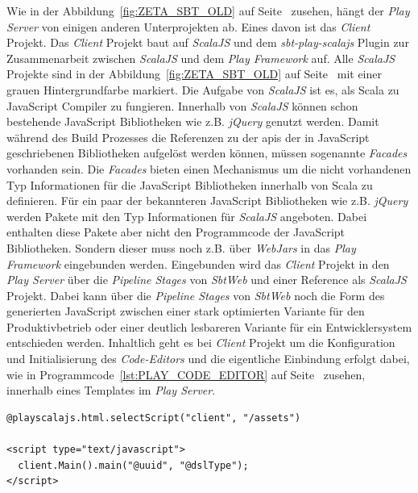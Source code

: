 Wie in der Abbildung~\ref{fig:ZETA_SBT_OLD} auf Seite~\pageref{fig:ZETA_SBT_OLD} zusehen, hängt der \textit{Play Server} von einigen anderen Unterprojekten ab. Eines davon ist das \textit{Client} Projekt. Das \textit{Client} Projekt baut auf \textit{ScalaJS} und dem \textit{sbt-play-scalajs} Plugin zur Zusammenarbeit zwischen \textit{ScalaJS} und dem \textit{Play Framework} auf. Alle \textit{ScalaJS} Projekte sind in der Abbildung~\ref{fig:ZETA_SBT_OLD} auf Seite~\pageref{fig:ZETA_SBT_OLD} mit einer grauen Hintergrundfarbe markiert. Die Aufgabe von \textit{ScalaJS} ist es, als Scala zu JavaScript Compiler zu fungieren. Innerhalb von \textit{ScalaJS} können schon bestehende JavaScript Bibliotheken wie z.B. \textit{jQuery} genutzt werden. Damit während des Build Prozesses die Referenzen zu der \acp{api} der in JavaScript geschriebenen Bibliotheken aufgelöst werden können, müssen sogenannte \textit{Facades} vorhanden sein. Die \textit{Facades} bieten einen Mechanismus um die nicht vorhandenen Typ Informationen für die JavaScript Bibliotheken innerhalb von Scala zu definieren. Für ein paar der bekannteren JavaScript Bibliotheken wie z.B. \textit{jQuery} werden Pakete mit den Typ Informationen für \textit{ScalaJS} angeboten. Dabei enthalten diese Pakete aber nicht den Programmcode der JavaScript Bibliotheken. Sondern dieser muss noch z.B. über \textit{WebJars} in das \textit{Play Framework} eingebunden werden. Eingebunden wird das \textit{Client} Projekt in den \textit{Play Server} über die \textit{Pipeline Stages} von \textit{SbtWeb} und einer Reference als \textit{ScalaJS} Projekt. Dabei kann über die \textit{Pipeline Stages} von \textit{SbtWeb} noch die Form des generierten JavaScript zwischen einer stark optimierten Variante für den Produktivbetrieb oder einer deutlich lesbareren Variante für ein Entwicklersystem entschieden werden. Inhaltlich geht es bei \textit{Client} Projekt um die Konfiguration und Initialisierung des \textit{Code-Editors} und die eigentliche Einbindung erfolgt dabei, wie in Programmcode~\ref{lst:PLAY_CODE_EDITOR} auf Seite~\pageref{lst:PLAY_CODE_EDITOR} zusehen, innerhalb eines Templates im \textit{Play Server}.

\bigskip
\begin{lstlisting}[caption={[Lade und initialisiere Client]Lade und initialisiere Client \cite{zeta_load_client}},label={lst:PLAY_CODE_EDITOR}]
@playscalajs.html.selectScript("client", "/assets")

<script type="text/javascript">
  client.Main().main("@uuid", "@dslType");
</script>
\end{lstlisting}
\smallskip

